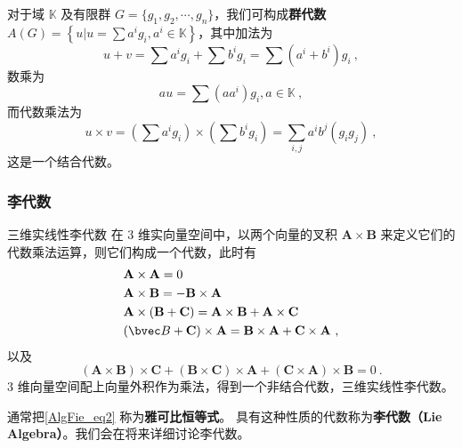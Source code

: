 \begin{example}{}
对于域 $\mathbb{K} $ 及有限群 $G=\{g_1,g_2,\cdots,g_n\}$，我们可构成\textbf{群代数}$\displaystyle A(G)=\left\{u | u=\sum a^{i} g_{i}, a^{i} \in \mathbb{K}\right\}$，其中加法为
\begin{equation}
u+v=\sum a^{i} g_{i}+\sum b^{i} g_{i}=\sum\left(a^{i}+b^{i}\right) g_{i}~,
\end{equation}
数乘为
\begin{equation}\label{AlgFie_eq2}
a u=\sum\left(a a^{i}\right) g_{i}, a \in \mathbb{K}~,
\end{equation}
而代数乘法为
\begin{equation}
u \times v=\left(\sum a^{i} g_{i}\right) \times\left(\sum b^{i} g_{i}\right)=\sum_{i, j} a^{i} b^{j}\left(g_{i} g_{j}\right)~,
\end{equation}
这是一个结合代数。
\end{example}

\subsubsection{李代数}

\begin{example}{三维实线性李代数}
在 $3$ 维实向量空间中，以两个向量的叉积 $\mathbf A\times \mathbf B$ 来定义它们的代数乘法运算，则它们构成一个代数，此时有
\begin{equation}
\begin{aligned}
&\mathbf{A} \times \mathbf{A}=0\\
&\mathbf{A} \times \mathbf{B}=-\mathbf{B} \times \mathbf{A}\\
&\mathbf{A} \times(\mathbf{B}+\mathbf{C})=\mathbf{A} \times \mathbf{B}+\mathbf{A} \times \mathbf{C}\\
&(\bvec B+\mathbf{C}) \times \mathbf{A}=\mathbf{B} \times \mathbf{A}+\mathbf{C} \times \mathbf{A}~,
\end{aligned}
\end{equation}
以及
\begin{equation} \label{AlgFie_eq1}
(\mathbf{A} \times \mathbf{B}) \times \mathbf{C}+(\mathbf{B} \times \mathbf{C}) \times \mathbf{A}+(\mathbf{C} \times \mathbf{A}) \times \mathbf{B}=0~.
\end{equation}
$3$ 维向量空间配上向量外积作为乘法，得到一个非结合代数，三维实线性李代数。
\end{example}

通常把\autoref{AlgFie_eq2}  称为\textbf{雅可比恒等式}。 具有这种性质的代数称为\textbf{李代数（Lie Algebra）}。我们会在将来详细讨论李代数。

